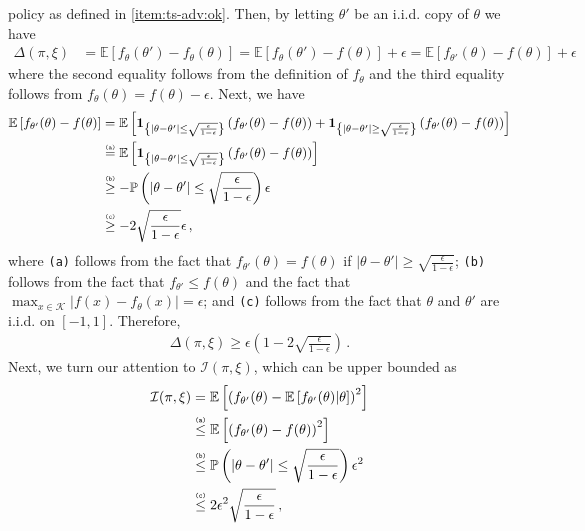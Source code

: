 \documentclass[letter, 12pt]{report}
\newcommand{\explan}[1]{\stackrel{\text{\tiny \texttt{#1}}}}
\newcommand{\paren}[1]{\left( #1 \right)}
\newcommand{\brak}[1]{\left[ #1 \right]}
\newcommand{\E}{\mathbb E}
\newcommand{\cK}{\mathcal K}
\newcommand{\sind}{\bm{1}}
\newcommand{\I}{\mathcal{I}}
\newcommand{\1}{\mathbf{1}}
\theoremstyle{plain}
\theoremstyle{definition}
\theoremstyle{remark}
\begin{document}
policy as defined in \ref{item:ts-adv:ok}.
Then, by letting $\theta'$ be an i.i.d. copy of $\theta$ we have
\begin{align*}
    \Delta(\pi, \xi)
     & =
    \E\brak{
        f_{\theta}(\theta') - f_\theta(\theta)
    }
    =
    \E\brak{
        f_{\theta}(\theta') - f(\theta)
    } + \epsilon
    =
    \E\brak{
        f_{\theta'}(\theta) - f(\theta)
    } + \epsilon
\end{align*}
where the second equality follows from the definition of $f_\theta$ and the third equality follows from $f_\theta(\theta) = f(\theta) - \epsilon$.
Next, we have
\begin{align*}
    \E\brak{
        f_{\theta'}(\theta) - f(\theta)
    }
     & =
    \E\brak{
        \sind_{
            \left\{
            |\theta - \theta'| \leq \sqrt{\frac{\epsilon}{1-\epsilon}}
            \right\}
        }
        \paren{
            f_{\theta'}(\theta) - f(\theta)
        }
        +
        \sind_{
            \left\{
            |\theta - \theta'| \geq \sqrt{\frac{\epsilon}{1-\epsilon}}
            \right\}
        }
        \paren{
            f_{\theta'}(\theta) - f(\theta)
        }
    }    \\
     &
    \explan{(a)}
    =
    \E\brak{
        \sind_{
            \left\{
            |\theta - \theta'| \leq \sqrt{\frac{\epsilon}{1-\epsilon}}
            \right\}
        }
        \paren{
            f_{\theta'}(\theta) - f(\theta)
        }
    }
    \\
     &
    \explan{(b)}
    \geq
    -
    \mathbb{P}\paren{
        |\theta - \theta'| \leq \sqrt{\frac{\epsilon}{1-\epsilon}}
    }
    \epsilon
    \\
     &
    \explan{(c)}
    \geq
    -
    2 \sqrt{\frac{\epsilon}{1-\epsilon}}
    \epsilon\,,
\end{align*}
where \texttt{(a)} follows from the fact that $f_{\theta'}(\theta) = f(\theta)$
if $|\theta - \theta'| \geq \sqrt{\frac{\epsilon}{1-\epsilon}}$;
\texttt{(b)} follows from the fact that $f_{\theta'} \leq f(\theta)$
and the fact that $\max_{x \in \cK} |f(x) - f_\theta(x)| = \epsilon$;
and \texttt{(c)} follows from the fact that $\theta$ and $\theta'$ are i.i.d. on $[-1,1]$.
Therefore,
\begin{align*}
    \Delta(\pi, \xi)
    \geq
    \epsilon \paren{1 - 2 \sqrt{\frac{\epsilon}{1-\epsilon}}}\,.
\end{align*}
Next, we turn our attention to $\I(\pi, \xi)$, which can be upper bounded as
\begin{align*}
    \I(\pi, \xi)
     & =
    \E\brak{
        \paren{
            f_{\theta'}(\theta) - \E\brak{f_{\theta'}(\theta)|\theta}
        }^2
    }
    \\
     &
    \explan{(a)}
    \leq
    \E\brak{
        \paren{
            f_{\theta'}(\theta) - f(\theta)
        }^2
    }
    \\
     &
    \explan{(b)}
    \leq
    \mathbb{P}\paren{
        |\theta - \theta'| \leq \sqrt{\frac{\epsilon}{1-\epsilon}}
    }
    \epsilon^2
    \\
     &
    \explan{(c)}
    \leq
    2 \epsilon^2\sqrt{\frac{\epsilon}{1-\epsilon}}\,,
\end{align*}
\end{document}
